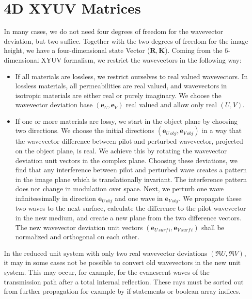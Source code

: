 \documentclass[12pt,a4paper,twoside,openright,BCOR10mm,headsepline,titlepage,abstracton,chapterprefix,final]{scrreprt}
\newcommand\Vector[1]{{\mathbf{#1}}}
\begin{document}
\section{4D XYUV Matrices}
In many cases, we do not need four degrees of freedom for the wavevector deviation, but two suffice.
Together with the two degrees of freedom for the image height, we have a four-dimensional state Vector ($\Vector{R}, \Vector{K}$).
Coming from the 6-dimensional XYUV formalism, we restrict the wavevectors in the following way:
\begin{itemize}
 \item If all materials are lossless, we restrict ourselves to real valued wavevectors.
       In lossless materials, all permeabilities are real valued, and wavevectors in isotropic materials are either real or purely imaginary.
       We choose the wavevector deviation base $( \Vector{e}_U, \Vector{e}_V)$ real valued and allow only real $(U,V)$.
 \item If one or more materials are lossy, we start in the object plane by choosing two directions.
       We choose the initial directions $( \Vector{e}_{U\,obj}, \Vector{e}_{V\,obj})$ in a way that the
       wavevector difference between pilot and perturbed wavevector, projected on the object plane, is real.
       We achieve this by rotating the wavevector deviation unit vectors in the complex plane.
       Choosing these deviations, we find that any interference between pilot and perturbed wave
       creates a pattern in the image plane which is translationally invariant.
       The interference pattern does not change in modulation over space.
       Next, we perturb one wave infinitessimally in direction $\Vector{e}_{U\,obj}$ and one wave in $\Vector{e}_{V\,obj}$.
       We propagate these two waves to the next surface, calculate the difference to the pilot wavevector in the new medium,
       and create a new plane from the two difference vectors.
       The new wavevector deviation unit vectors $( \Vector{e}_{U\,surf\,i}, \Vector{e}_{V\,surf\,i})$ shall be normalized and orthogonal on each other.
\end{itemize}
In the reduced unit system with only two real wavevector deviations $(\Re U, \Re V)$,
it may in some cases not be possible to convert old wavevectors in the new unit system.
This may occur, for example, for the evanescent waves of the transmission path after a total internal reflection.
These rays must be sorted out from further propagation for example by if-statements or boolean array indices.
\end{document}
